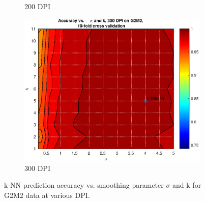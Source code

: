 \begin{figure}[h]
\begin{subfigure}{0.32\textwidth}
		\caption{200 DPI}
	\end{subfigure}
	\begin{subfigure}{0.32\textwidth}
		\includegraphics[width = \textwidth]{img/knn-AccVsKVsSigma-G2M2-dpi300-cv10}
		\caption{300 DPI}
	\end{subfigure}
	\caption[k-NN prediction accuracy vs. smoothing parameter $\sigma$
			and k at various DPI.]{
		k-NN prediction accuracy vs. smoothing parameter $\sigma$
		and k for G2M2 data at various DPI.
		}
	\label{fig:knn-AccVsKVsSigma-G2M2}
\end{figure}

